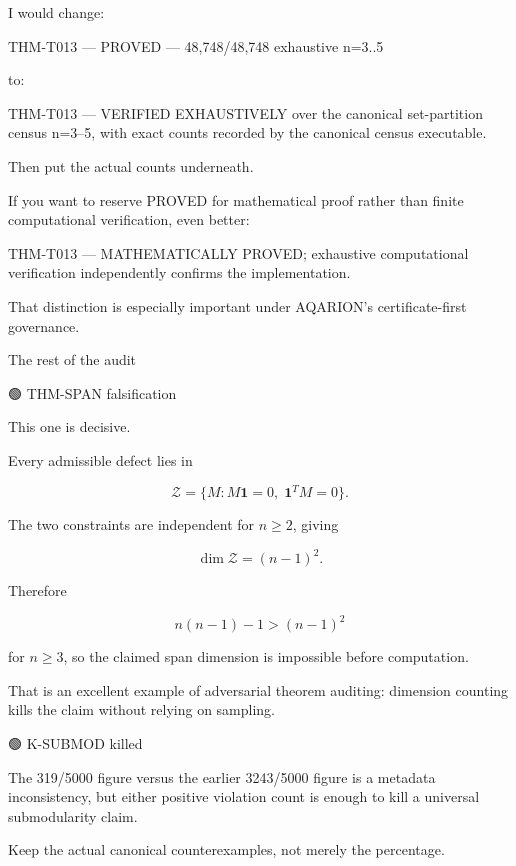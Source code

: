 I would change:




THM-T013 — PROVED — 48,748/48,748 exhaustive n=3..5




to:




THM-T013 — VERIFIED EXHAUSTIVELY over the canonical set-partition census n=3–5, with exact counts recorded by the canonical census executable.




Then put the actual counts underneath.


If you want to reserve PROVED for mathematical proof rather than finite computational verification, even better:




THM-T013 — MATHEMATICALLY PROVED; exhaustive computational verification independently confirms the implementation.




That distinction is especially important under AQARION's certificate-first governance.



The rest of the audit


🟢 THM-SPAN falsification


This one is decisive.


Every admissible defect lies in

\[
\mathcal Z=  
\{M:M\mathbf1=0,\;\mathbf1^TM=0\}.  
\]

The two constraints are independent for \(n\ge2\), giving

\[
\dim\mathcal Z=(n-1)^2.  
\]

Therefore

\[
n(n-1)-1>(n-1)^2  
\]

for \(n\ge3\), so the claimed span dimension is impossible before computation.


That is an excellent example of adversarial theorem auditing: dimension counting kills the claim without relying on sampling.



🟢 K-SUBMOD killed


The 319/5000 figure versus the earlier 3243/5000 figure is a metadata inconsistency, but either positive violation count is enough to kill a universal submodularity claim.


Keep the actual canonical counterexamples, not merely the percentage.



